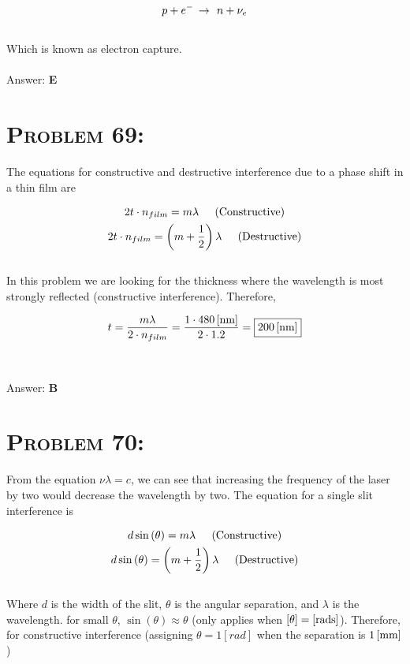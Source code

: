 \documentclass{article}
\begin{document}
\begin{gather}
p + e^{-} \hspace{.025in} \rightarrow \hspace{.05in} n + \nu_{e}
\end{gather}
\\
Which is known as electron capture.
\\\\
Answer: \textbf{\textcolor{ProcessBlue}E}\\


\section{\textsc{Problem 69:}} The equations for constructive and destructive interference due to a phase shift in a thin film are

\begin{gather}
2 t \cdot n_{film} = m \lambda \hspace{.2in} \text{(Constructive)}\\
2 t \cdot n_{film} = \left(m    +  \frac{1}{2}  \right) \lambda \hspace{.2in} \text{(Destructive)}
\end{gather}
\\
In this problem we are looking for the thickness where the wavelength is most strongly reflected (constructive interference). Therefore,

\begin{gather}
t = \frac{m \lambda}{2 \cdot n_{film}} \nonumber = \frac{1 \cdot \unit[480]{[nm]}}{2 \cdot 1.2} = \boxed{\unit[200]{[nm]}}
\end{gather}
\\\\
Answer: \textbf{\textcolor{ProcessBlue}B}\\


\section{\textsc{Problem 70:}} From the equation $ \nu \lambda = c $, we can see that increasing the frequency of the laser by two would decrease the wavelength by two. The equation for a single slit interference is

\begin{gather}
 d \sin{(\theta)} = m \lambda \hspace{.2in} \text{(Constructive)}\\
 d \sin{(\theta)} = \left(  m + \frac{1}{2} \right)  \lambda \hspace{.2in} \text{(Destructive)}
\end{gather}
\\
Where $d$ is the width of the slit, $\theta$ is the angular separation, and $\lambda$ is the wavelength. for small $\theta$, $\sin{(\theta)} \approx \theta$ (only applies when $[\theta] = \unit[]{[rads]}$). Therefore, for constructive interference (assigning $\theta =1[rad]$ when the separation is $\unit[1]{[mm]}$)
\end{document}
